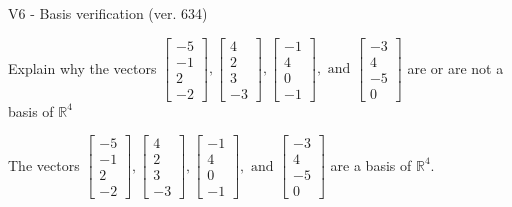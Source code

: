 \begin{exercise}
  \begin{exerciseTitle}V6 - Basis verification (ver. 634)\end{exerciseTitle}
  \begin{exerciseStatement}
    Explain why the vectors \(\left[\begin{array}{r}
-5 \\
-1 \\
2 \\
-2
\end{array}\right] , \left[\begin{array}{r}
4 \\
2 \\
3 \\
-3
\end{array}\right] , \left[\begin{array}{r}
-1 \\
4 \\
0 \\
-1
\end{array}\right] , \text{ and } \left[\begin{array}{r}
-3 \\
4 \\
-5 \\
0
\end{array}\right]\) are or are not a basis of \(\mathbb{R}^4\)	


  \end{exerciseStatement}
  \begin{exerciseAnswer}
   The vectors \(\left[\begin{array}{r}
-5 \\
-1 \\
2 \\
-2
\end{array}\right] , \left[\begin{array}{r}
4 \\
2 \\
3 \\
-3
\end{array}\right] , \left[\begin{array}{r}
-1 \\
4 \\
0 \\
-1
\end{array}\right] , \text{ and } \left[\begin{array}{r}
-3 \\
4 \\
-5 \\
0
\end{array}\right]\) 
  	 are  a basis of \(\mathbb{R}^4\).
  


  \end{exerciseAnswer}
\end{exercise}